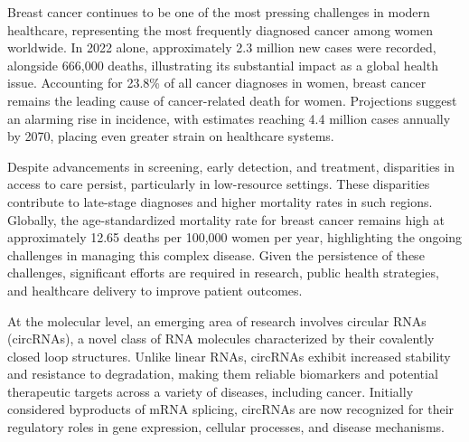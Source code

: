Breast cancer continues to be one of the most pressing challenges in modern
healthcare, representing the most frequently diagnosed cancer among women
worldwide.
In 2022 alone, approximately 2.3 million new cases were recorded, alongside
666,000 deaths, illustrating its substantial impact as a global health issue.
Accounting for 23.8\% of all cancer diagnoses in
women\supercite{bray_global_2024,ferlay_global_2024}, breast cancer remains the
leading cause of cancer-related death for women.
Projections suggest an alarming rise in incidence, with estimates reaching 4.4
million cases annually by 2070, placing even greater strain on healthcare
systems\supercite{lei_global_2021}.

Despite advancements in screening, early detection, and treatment, disparities
in access to care persist, particularly in low-resource settings.
These disparities contribute to late-stage diagnoses and higher mortality rates
in such regions\supercite{wilkinson_understanding_2022,ginsburg_breast_2020}.
Globally, the age-standardized mortality rate for breast cancer remains high at
approximately 12.65 deaths per 100,000 women per year, highlighting the ongoing
challenges in managing this complex
disease\supercite{bray_global_2024,ferlay_global_2024}.
Given the persistence of these challenges, significant efforts are required in
research, public health strategies, and healthcare delivery to improve patient
outcomes\supercite{desantis_breast_2019}.

At the molecular level, an emerging area of research involves circular RNAs
(circRNAs), a novel class of RNA molecules characterized by their covalently
closed loop structures.
Unlike linear RNAs, circRNAs exhibit increased stability and resistance to
degradation, making them reliable biomarkers and potential therapeutic targets
across a variety of diseases, including
cancer\supercite{ma_circular_2020,hoque_exploring_2023,wilusz_circular_2017}.
Initially considered byproducts of mRNA splicing, circRNAs are now recognized
for their regulatory roles in gene expression, cellular processes, and disease
mechanisms\supercite{cherubini_foxp1_2019,wilusz_360_2018}.

